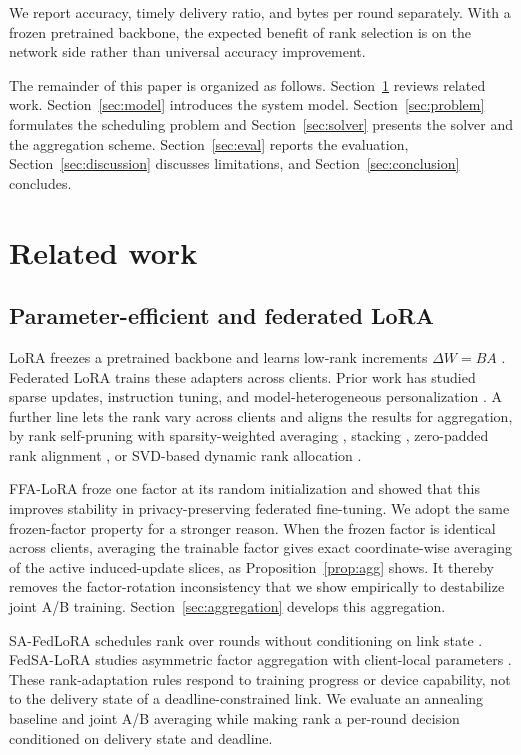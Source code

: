 \documentclass[preprint,12pt]{elsarticle}
\begin{document}
We report accuracy, timely delivery ratio, and bytes per round separately. With a frozen pretrained backbone, the expected benefit of rank selection is on the network side rather than universal accuracy improvement.

The remainder of this paper is organized as follows. Section~\ref{sec:related} reviews related work. Section~\ref{sec:model} introduces the system model. Section~\ref{sec:problem} formulates the scheduling problem and Section~\ref{sec:solver} presents the solver and the aggregation scheme. Section~\ref{sec:eval} reports the evaluation, Section~\ref{sec:discussion} discusses limitations, and Section~\ref{sec:conclusion} concludes.

\section{Related work}
\label{sec:related}

\subsection{Parameter-efficient and federated LoRA}
LoRA freezes a pretrained backbone and learns low-rank increments $\Delta W=BA$ \cite{hu2022lora}. Federated LoRA trains these adapters across clients. Prior work has studied sparse updates, instruction tuning, and model-heterogeneous personalization \cite{babakniya2023slora,zhang2024fedit,yi2026pfedlora}. A further line lets the rank vary across clients and aligns the results for aggregation, by rank self-pruning with sparsity-weighted averaging \cite{cho2024hetlora}, stacking \cite{wang2024flora}, zero-padded rank alignment \cite{fan2025helora}, or SVD-based dynamic rank allocation \cite{wu2026fedara}.

FFA-LoRA \cite{sun2024ffalora} froze one factor at its random initialization and showed that this improves stability in privacy-preserving federated fine-tuning. We adopt the same frozen-factor property for a stronger reason. When the frozen factor is identical across clients, averaging the trainable factor gives exact coordinate-wise averaging of the active induced-update slices, as Proposition~\ref{prop:agg} shows. It thereby removes the factor-rotation inconsistency that we show empirically to destabilize joint A/B training. Section~\ref{sec:aggregation} develops this aggregation.

SA-FedLoRA schedules rank over rounds without conditioning on link state \cite{yang2024safedlora}. FedSA-LoRA studies asymmetric factor aggregation with client-local parameters \cite{guo2025fedsalora}. These rank-adaptation rules respond to training progress or device capability, not to the delivery state of a deadline-constrained link. We evaluate an annealing baseline and joint A/B averaging while making rank a per-round decision conditioned on delivery state and deadline.
\end{document}
